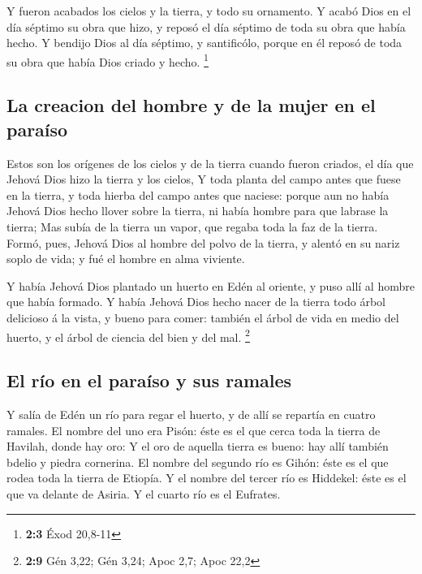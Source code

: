  Y fueron acabados los cielos y la tierra, y todo su
ornamento.  Y acabó Dios en el día séptimo su obra que
hizo, y reposó el día séptimo de toda su obra que había hecho.
 Y bendijo Dios al día séptimo, y santificólo, porque en
él reposó de toda su obra que había Dios criado y hecho. \footnote{\textbf{2:3}
  Éxod 20,8-11}

\hypertarget{la-creacion-del-hombre-y-de-la-mujer-en-el-parauxedso}{%
\subsection{La creacion del hombre y de la mujer en el
paraíso}\label{la-creacion-del-hombre-y-de-la-mujer-en-el-parauxedso}}

 Estos son los orígenes de los cielos y de la tierra
cuando fueron criados, el día que Jehová Dios hizo la tierra y los
cielos,  Y toda planta del campo antes que fuese en la
tierra, y toda hierba del campo antes que naciese: porque aun no había
Jehová Dios hecho llover sobre la tierra, ni había hombre para que
labrase la tierra;  Mas subía de la tierra un vapor, que
regaba toda la faz de la tierra.  Formó, pues, Jehová Dios
al hombre del polvo de la tierra, y alentó en su nariz soplo de vida; y
fué el hombre en alma viviente.

 Y había Jehová Dios plantado un huerto en Edén al
oriente, y puso allí al hombre que había formado.  Y había
Jehová Dios hecho nacer de la tierra todo árbol delicioso á la vista, y
bueno para comer: también el árbol de vida en medio del huerto, y el
árbol de ciencia del bien y del mal. \footnote{\textbf{2:9} Gén 3,22;
  Gén 3,24; Apoc 2,7; Apoc 22,2}

\hypertarget{el-ruxedo-en-el-parauxedso-y-sus-ramales}{%
\subsection{El río en el paraíso y sus
ramales}\label{el-ruxedo-en-el-parauxedso-y-sus-ramales}}

 Y salía de Edén un río para regar el huerto, y de allí
se repartía en cuatro ramales.  El nombre del uno era
Pisón: éste es el que cerca toda la tierra de Havilah, donde hay oro:
 Y el oro de aquella tierra es bueno: hay allí también
bdelio y piedra cornerina.  El nombre del segundo río es
Gihón: éste es el que rodea toda la tierra de Etiopía.  Y
el nombre del tercer río es Hiddekel: éste es el que va delante de
Asiria. Y el cuarto río es el Eufrates.

